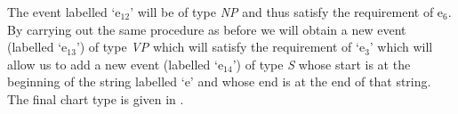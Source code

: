 The event labelled `e$_{12}$' will be of type \textit{NP} and thus
satisfy the requirement of e$_6$.  By carrying out the same procedure
as before we will obtain a new event (labelled `e$_{13}$') of type
\textit{VP} which will satisfy the requirement of `e$_3$' which will
allow us to add a new event (labelled `e$_{14}$') of type \textit{S}
whose start is at the beginning of the string labelled `e' and whose
end is at the end of that string.  The final chart type is given in
\nexteg{}.
\begin{figure}
\begin{ex} 
\end{ex}
\end{figure}
